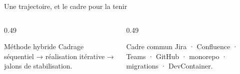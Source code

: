 \begin{frame}{Une trajectoire, et le cadre pour la tenir}
\begin{center}
\end{center}
\vspace{0.25em}
\begin{columns}[T]
\begin{column}{0.49\linewidth}
\begin{block}{Méthode hybride}
\small Cadrage séquentiel → réalisation itérative → jalons de stabilisation.
\end{block}
\end{column}
\begin{column}{0.49\linewidth}
\begin{block}{Cadre commun}
\small Jira · Confluence · Teams · GitHub · monorepo · migrations · DevContainer.
\end{block}
\end{column}
\end{columns}
\end{frame}

